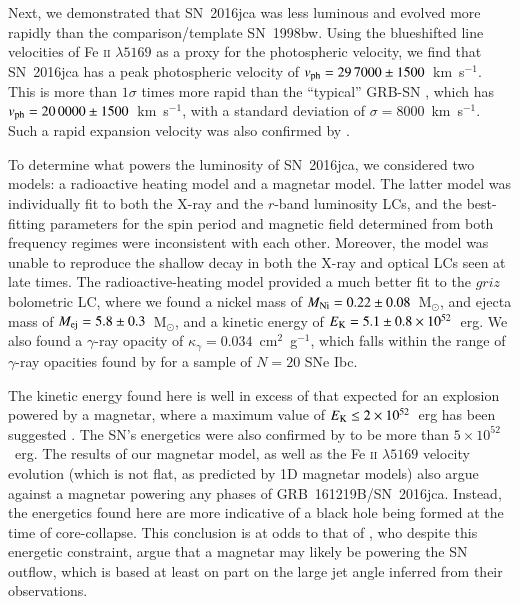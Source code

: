 \documentclass[traditabstract,longauth]{aa}
\begin{document}
Next, we demonstrated that SN~2016jca was less luminous and evolved more rapidly than the comparison/template SN~1998bw.  Using the blueshifted line velocities of Fe \textsc{ii} $\lambda5169$ as a proxy for the photospheric velocity, we find that SN~2016jca has a peak photospheric velocity of $v_{\rm ph} = 29\,7000\pm1500$~km~s$^{-1}$.  This is more than $1\sigma$ times more rapid than the ``typical'' GRB-SN \citep{Cano2016}, which has $v_{\rm ph} = 20\,0000\pm1500$~km~s$^{-1}$, with a standard deviation of $\sigma=8000$~km~s$^{-1}$.  Such a rapid expansion velocity was also confirmed by \citet{Ashall17}.

To determine what powers the luminosity of SN~2016jca, we considered two models: a radioactive heating model and a magnetar model.  The latter model was individually fit to both the X-ray and the $r$-band luminosity LCs, and the best-fitting parameters for the spin period and magnetic field determined from both frequency regimes were inconsistent with each other.  Moreover, the model was unable to reproduce the shallow decay in both the X-ray and optical LCs seen at late times. The radioactive-heating model provided a much better fit to the $griz$ bolometric LC, where we found a nickel mass of $M_{\rm Ni} = 0.22\pm0.08$~M$_{\odot}$, and ejecta mass of $M_{\rm ej} = 5.8\pm0.3$~M$_{\odot}$, and a kinetic energy of $E_{\rm K} = 5.1\pm0.8\times10^{52}$~erg.   We also found a $\gamma$-ray opacity of $\kappa_{\gamma} = 0.034$~cm$^2$~g$^{-1}$, which falls within the range of $\gamma$-ray opacities found by \citet{Wheeler15} for a sample of $N=20$ SNe Ibc.

The kinetic energy found here is well in excess of that expected for an explosion powered by a magnetar, where a maximum value of $E_{\rm K} \leq 2\times10^{52}$~erg has been suggested \citep{Usov92,Mazzali14}.  The SN's energetics were also confirmed by \citet{Ashall17} to be more than $5\times10^{52}$~erg.  The results of our magnetar model, as well as the Fe \textsc{ii} $\lambda5169$ velocity evolution (which is not flat, as predicted by 1D magnetar models) also argue against a magnetar powering any phases of GRB~161219B/SN~2016jca.  Instead, the energetics found here are more indicative of a black hole being formed at the time of core-collapse.  This conclusion is at odds to that of \citet{Ashall17}, who despite this energetic constraint, argue that a magnetar may likely be powering the SN outflow, which is based at least on part on the large jet angle inferred from their observations.
\end{document}
